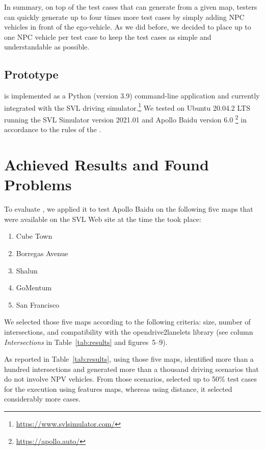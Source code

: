 \documentclass[conference]{IEEEtran}
\begin{document}
In summary, on top of the test cases that \tool can generate from a given map, testers can quickly generate up to four times more test cases by simply adding NPC vehicles in front of the ego-vehicle. As we did before, we decided to place up to one NPC vehicle per test case to keep the test cases as simple and understandable as possible.

\subsection{Prototype}
\tool is implemented as a Python (version 3.9) command-line application and currently integrated with the SVL driving simulator.\footnote{\href{https://www.svlsimulator.com/}{https://www.svlsimulator.com/}} 
%
We tested \tool on Ubuntu 20.04.2 LTS running the SVL Simulator version 2021.01 and Apollo Baidu version 6.0 \footnote{\href{https://apollo.auto/}{https://apollo.auto/}} in accordance to the rules of the \challenge.

\section{Achieved Results and Found Problems}
To evaluate \tool, we applied it to test Apollo Baidu on the following five maps that were available on the SVL Web site at the time the \challenge took place:

\begin{enumerate}
 \item Cube Town
 \item Borregas Avenue
 \item Shalun
 \item GoMentum
 \item San Francisco
\end{enumerate}

We selected those five maps according to the following criteria: size, number of intersections, and compatibility with the opendrive2lanelets library (see column \emph{Intersections} in Table~\ref{tab:results} and figures~5--9).

As reported in Table~\ref{tab:results}, using those five maps, \tool identified more than a hundred intersections and generated more than a thousand driving scenarios that do not involve NPV vehicles. From those scenarios, \tool selected up to 50\% test cases for the execution using features maps, whereas using distance, it selected considerably more cases.
\end{document}
